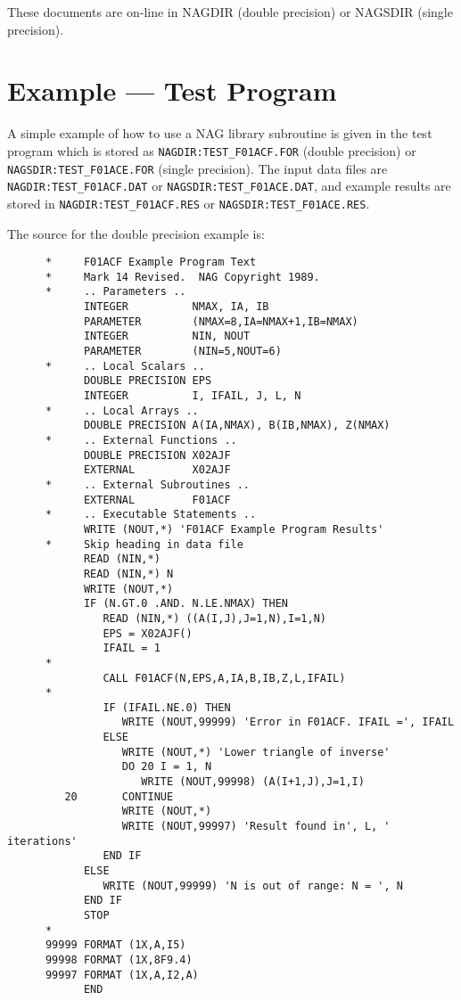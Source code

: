 These documents are on-line in NAGDIR (double precision) or NAGSDIR (single
precision).

\appendix

\newpage
\section{Example --- Test Program}
\label{se:exa}

A simple example of how to use a NAG library subroutine is given in the test
program which is stored as {\tt NAGDIR:TEST\_F01ACF.FOR} (double precision) or
{\tt NAGSDIR:TEST\_F01ACE.FOR} (single precision). The input data files are
{\tt NAGDIR:TEST\_F01ACF.DAT} or  {\tt NAGSDIR:TEST\_F01ACE.DAT}, and example
results are stored in {\tt NAGDIR:TEST\_F01ACF.RES} or
{\tt NAGSDIR:TEST\_F01ACE.RES}.

The source for the double precision example is:

\begin{small}
\begin{verbatim}
      *     F01ACF Example Program Text
      *     Mark 14 Revised.  NAG Copyright 1989.
      *     .. Parameters ..
            INTEGER          NMAX, IA, IB
            PARAMETER        (NMAX=8,IA=NMAX+1,IB=NMAX)
            INTEGER          NIN, NOUT
            PARAMETER        (NIN=5,NOUT=6)
      *     .. Local Scalars ..
            DOUBLE PRECISION EPS
            INTEGER          I, IFAIL, J, L, N
      *     .. Local Arrays ..
            DOUBLE PRECISION A(IA,NMAX), B(IB,NMAX), Z(NMAX)
      *     .. External Functions ..
            DOUBLE PRECISION X02AJF
            EXTERNAL         X02AJF
      *     .. External Subroutines ..
            EXTERNAL         F01ACF
      *     .. Executable Statements ..
            WRITE (NOUT,*) 'F01ACF Example Program Results'
      *     Skip heading in data file
            READ (NIN,*)
            READ (NIN,*) N
            WRITE (NOUT,*)
            IF (N.GT.0 .AND. N.LE.NMAX) THEN
               READ (NIN,*) ((A(I,J),J=1,N),I=1,N)
               EPS = X02AJF()
               IFAIL = 1
      *
               CALL F01ACF(N,EPS,A,IA,B,IB,Z,L,IFAIL)
      *
               IF (IFAIL.NE.0) THEN
                  WRITE (NOUT,99999) 'Error in F01ACF. IFAIL =', IFAIL
               ELSE
                  WRITE (NOUT,*) 'Lower triangle of inverse'
                  DO 20 I = 1, N
                     WRITE (NOUT,99998) (A(I+1,J),J=1,I)
         20       CONTINUE
                  WRITE (NOUT,*)
                  WRITE (NOUT,99997) 'Result found in', L, ' iterations'
               END IF
            ELSE
               WRITE (NOUT,99999) 'N is out of range: N = ', N
            END IF
            STOP
      *
      99999 FORMAT (1X,A,I5)
      99998 FORMAT (1X,8F9.4)
      99997 FORMAT (1X,A,I2,A)
            END
\end{verbatim}
\end{small}

